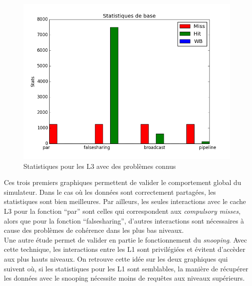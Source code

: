 \begin{figure}[H]
\begin{center}
   \includegraphics[scale=0.35]{images/stats_L3.png}
   \caption{\label{img:inclusifs} Statistiques pour les L3 avec des problèmes connus}
\end{center}
\end{figure}

Ces trois premiers graphiques permettent de valider le comportement global du simulateur. Dans le cas où les données sont correctement partagées, les statistiques sont bien meilleures. Par ailleurs, les seules interactions avec le cache L3 pour la fonction ``par'' sont celles qui correspondent aux \emph{compulsory misses}, alors que pour la fonction ``falsesharing'', d'autres interactions sont nécessaires à cause des problèmes de cohérence dans les plus bas niveaux. \\

Une autre étude permet de valider en partie le fonctionnement du \emph{snooping}. Avec cette technique, les interactions entre les L1 sont privilégiées et évitent d'accèder aux plus hauts niveaux. On retrouve cette idée sur les deux graphiques qui suivent où, si les statistiques pour les L1 sont semblables, la manière de récupérer les données avec le snooping nécessite moins de requêtes aux niveaux supérieurs. \\

